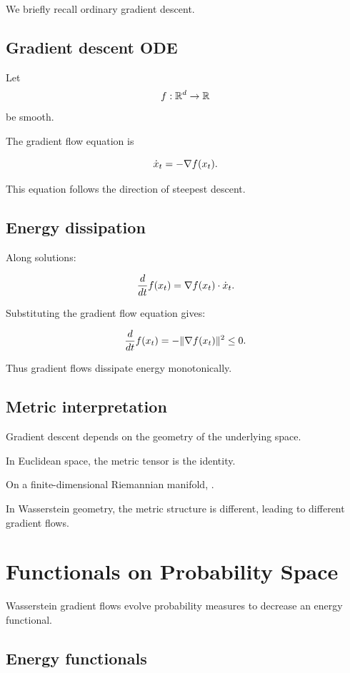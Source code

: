 We briefly recall ordinary gradient descent.

\subsection{Gradient descent ODE}

Let
\[
f : \mathbb{R}^d \to \mathbb{R}
\]
be smooth.

The gradient flow equation is

\[
\dot x_t = -\nabla f(x_t).
\]

This equation follows the direction of steepest descent.

\subsection{Energy dissipation}

Along solutions:

\[
\frac{d}{dt}f(x_t)
=
\nabla f(x_t) \cdot \dot x_t.
\]

Substituting the gradient flow equation gives:

\[
\frac{d}{dt}f(x_t)
=
-\|\nabla f(x_t)\|^2
\le 0.
\]

Thus gradient flows dissipate energy monotonically.

\subsection{Metric interpretation}

Gradient descent depends on the geometry of the underlying space.

In Euclidean space, the metric tensor is the identity.

On a finite-dimensional Riemannian manifold, .

In Wasserstein geometry, the metric structure is different, leading to different gradient flows.

\section{Functionals on Probability Space}

Wasserstein gradient flows evolve probability measures to decrease an energy functional.

\subsection{Energy functionals}

